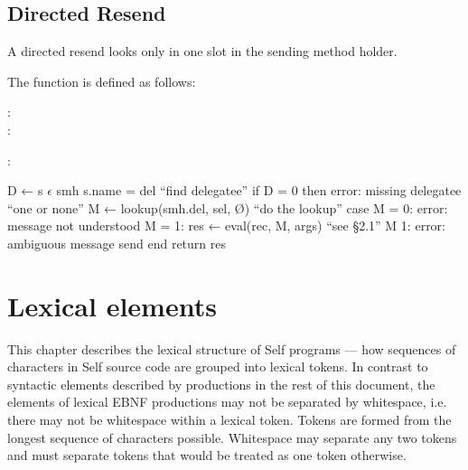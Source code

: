 \documentclass[letterpaper,10pt,english]{sphinxmanual}
\begin{document}
\subsection{Directed Resend}
\label{\detokenize{langref:directed-resend}}\label{\detokenize{langref:pp-directed-resend}}
A directed resend looks only in one slot in the sending method holder.

The function  is defined as follows:
\begin{description}
\item[{:}] \leavevmode
{}

\item[{:}] \leavevmode
{}

\end{description}

:

\begin{sphinxVerbatim}[commandchars=\\\{\}]
D ← \PYGZob{}s \(\epsilon\) smh \textbar{} s.name = del\PYGZcb{}                     “find delegatee”
if \textbar{} D \textbar{} = 0 then error: missing delegatee       “one or none”
M ← lookup(smh.del, sel, Ø)                      “do the lookup”
case
    \textbar{} M \textbar{} = 0: error: message not understood
    \textbar{} M \textbar{} = 1: res ← eval(rec, M, args)          “see \S{}2.1”
    \textbar{} M \textbar{} \PYGZgt{} 1: error: ambiguous message send
end
return res
\end{sphinxVerbatim}
\newpage

\section{Lexical elements}
\label{\detokenize{langref:lexical-elements}}
This chapter describes the lexical structure of Self programs — how sequences of characters in Self source code are grouped into lexical tokens. In contrast to syntactic elements described by productions in the rest of this document, the elements of lexical EBNF productions may not be separated by whitespace, i.e. there may not be whitespace within a lexical token. Tokens are formed from the longest sequence of characters possible. Whitespace may separate any two tokens and must separate tokens that would be treated as one token otherwise.
\end{document}
